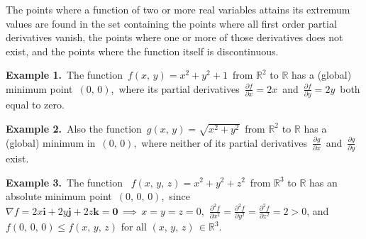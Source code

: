 \documentclass[12pt]{article}
\theoremstyle{definition}
\begin{document}
The points where a function of two or more real variables attains its extremum values are found in the set containing the points where all first order partial derivatives vanish, the points where one or more of those derivatives does not exist, and the points where the function itself is discontinuous.

\textbf{Example 1.}\, The function \,$f(x,\,y) = x^2\!+\!y^2\!+\!1$\, from $\mathbb{R}^2$ to $\mathbb{R}$ has a (global) minimum point\, $(0,\,0)$,\, where its partial derivatives\, $\frac{\partial f}{\partial x} = 2x$\, and\, 
$\frac{\partial f}{\partial y} = 2y$\, both equal to zero.

\textbf{Example 2.}\, Also the function \,$g(x,\,y) = \sqrt{x^2\!+\!y^2}$\, from $\mathbb{R}^2$ to $\mathbb{R}$ has a (global) minimum in\, $(0,\,0)$,\, where neither of its partial derivatives\, $\frac{\partial g}{\partial x}$\, and\, 
$\frac{\partial g}{\partial y}$\, exist.

\textbf{Example 3.}\, The function \, $f(x,\,y,\,z)= x^2\!+\!y^2\!+\!z^2$\, from $\mathbb{R}^3$ to $\mathbb{R}$ has an absolute minimum point\, $(0,\,0,\,0)$,\, since $\nabla{f}=2x\mathbf{i}\!+\!2y\mathbf{j}\!+\!2z\mathbf{k}=\mathbf{0}\,\implies\,x=y=z=0$,\, $\frac{\partial^2{f}}{\partial{x}^2}=\frac{\partial^2{f}}{\partial{y}^2}=\frac{\partial^2{f}}{\partial{z}^2}=2>0$, and $f(0,\,0,\,0)\leq f(x,\,y,\,z)$ for all $ (x,\,y,\,z)\,\in\mathbb{R}^3$.


\end{document}
